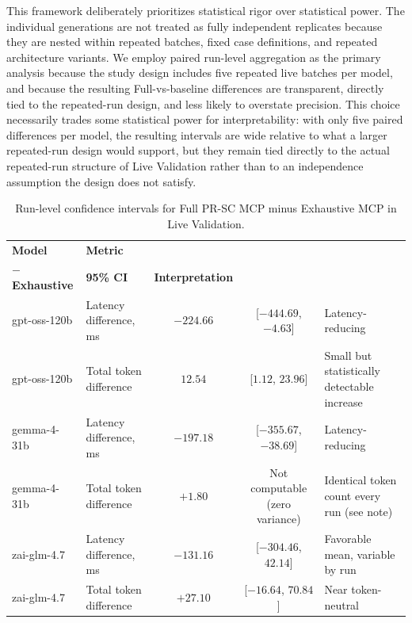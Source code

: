 This framework deliberately prioritizes statistical rigor over statistical power. The individual generations are not treated as fully independent replicates because they are nested within repeated batches, fixed case definitions, and repeated architecture variants. We employ paired run-level aggregation as the primary analysis because the study design includes five repeated live batches per model, and because the resulting Full-vs-baseline differences are transparent, directly tied to the repeated-run design, and less likely to overstate precision. This choice necessarily trades some statistical power for interpretability: with only five paired differences per model, the resulting intervals are wide relative to what a larger repeated-run design would support, but they remain tied directly to the actual repeated-run structure of Live Validation rather than to an independence assumption the design does not satisfy.

\begin{table}[!t]
  \caption{Run-level confidence intervals for Full PR-SC MCP minus Exhaustive MCP in Live Validation.}
  \label{tab:ci}
  \small
  \begin{tabular}{llccl}
    \toprule
    \textbf{Model} & \textbf{Metric} & \shortstack{\textbf{Mean Full}\\\textbf{$-$ Exhaustive}} & \textbf{95\% CI} & \textbf{Interpretation} \\
    \midrule
    gpt-oss-120b & Latency difference, ms & $-224.66$ & [$-444.69$, $-4.63$] & Latency-reducing \\
    gpt-oss-120b & Total token difference & $12.54$ & [$1.12$, $23.96$] & Small but statistically detectable increase \\
    gemma-4-31b & Latency difference, ms & $-197.18$ & [$-355.67$, $-38.69$] & Latency-reducing \\
    gemma-4-31b & Total token difference & $+1.80$ & Not computable (zero variance) & Identical token count every run (see note) \\
    zai-glm-4.7 & Latency difference, ms & $-131.16$ & [$-304.46$, $42.14$] & Favorable mean, variable by run \\
    zai-glm-4.7 & Total token difference & $+27.10$ & [$-16.64$, $70.84$] & Near token-neutral \\
    \bottomrule
  \end{tabular}
\end{table}

